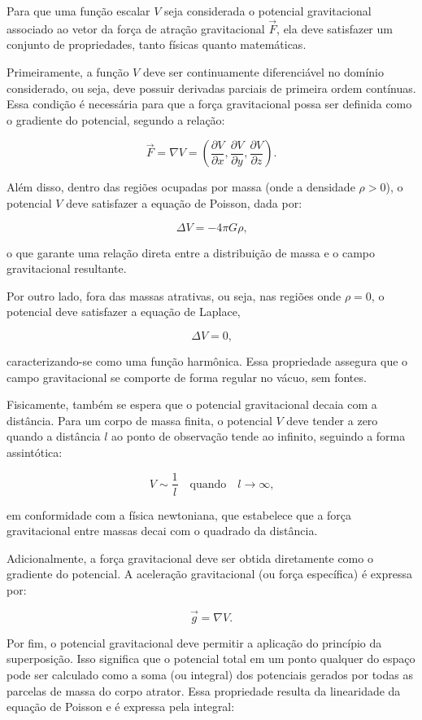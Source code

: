 Para que uma função escalar \( V \) seja considerada o potencial gravitacional associado ao vetor da força de atração gravitacional \( \vec{F} \), ela deve satisfazer um conjunto de propriedades, tanto físicas quanto matemáticas. 

Primeiramente, a função \( V \) deve ser continuamente diferenciável no domínio considerado, ou seja, deve possuir derivadas parciais de primeira ordem contínuas. Essa condição é necessária para que a força gravitacional possa ser definida como o gradiente do potencial, segundo a relação:

\[
\vec{F} = \nabla V = \left( \frac{\partial V}{\partial x}, \frac{\partial V}{\partial y}, \frac{\partial V}{\partial z} \right) \text{.}
\]

\noindent
Além disso, dentro das regiões ocupadas por massa (onde a densidade \( \rho > 0 \)), o potencial \( V \) deve satisfazer a equação de Poisson, dada por:

\[
\Delta V = -4\pi G \rho \text{,}
\]

\noindent
o que garante uma relação direta entre a distribuição de massa e o campo gravitacional resultante.

Por outro lado, fora das massas atrativas, ou seja, nas regiões onde \( \rho = 0 \), o potencial deve satisfazer a equação de Laplace,

\[
\Delta V = 0 \text{,}
\]

\noindent
caracterizando-se como uma função harmônica. Essa propriedade assegura que o campo gravitacional se comporte de forma regular no vácuo, sem fontes.

Fisicamente, também se espera que o potencial gravitacional decaia com a distância. Para um corpo de massa finita, o potencial \( V \) deve tender a zero quando a distância \( l \) ao ponto de observação tende ao infinito, seguindo a forma assintótica:

\[
V \sim \frac{1}{l} \quad \text{quando} \quad l \to \infty \text{,}
\]

\noindent
em conformidade com a física newtoniana, que estabelece que a força gravitacional entre massas decai com o quadrado da distância.

Adicionalmente, a força gravitacional deve ser obtida diretamente como o gradiente do potencial. A aceleração gravitacional (ou força específica) é expressa por:

\[
\vec{g} = \nabla V \text{.}
\]

Por fim, o potencial gravitacional deve permitir a aplicação do princípio da superposição. Isso significa que o potencial total em um ponto qualquer do espaço pode ser calculado como a soma (ou integral) dos potenciais gerados por todas as parcelas de massa do corpo atrator. Essa propriedade resulta da linearidade da equação de Poisson e é expressa pela integral:

